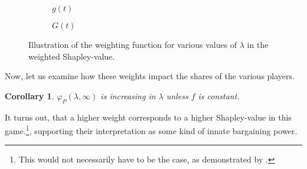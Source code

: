 \documentclass[a4paper]{article}
\newtheorem{corollary}{Corollary}
\begin{document}
\begin{figure}[ht]
    \centering
    \begin{subfigure}[b]{0.45\textwidth}
        \centering
        \caption{$g(t)$}
    \end{subfigure}
    \begin{subfigure}[b]{0.45\textwidth}
        \centering
        \caption{$G(t)$}
    \end{subfigure}
    \caption{Illustration of the weighting function for various values of $\lambda$ in the weighted Shapley-value.}
    \label{fig:weigh_function}
\end{figure}

Now, let us examine how these weights impact the shares of the various players.
\begin{corollary}
    \label{cor:platform_value_weighted}
    $\varphi_P(\lambda, \infty)$ is increasing in $\lambda$ unless $f$ is constant.
\end{corollary}
It turns out, that a higher weight corresponds to a higher Shapley-value in this game.\footnote{
    This would not necessarily have to be the case, as demonstrated by \textcite{owen1968communications}.
},
supporting their interpretation as some kind of innate bargaining power.
\end{document}
